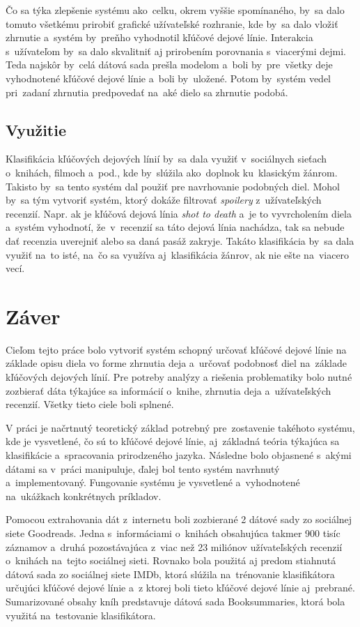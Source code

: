 Čo sa týka zlepšenie systému ako~celku, okrem vyššie spomínaného, by~sa dalo tomuto všetkému prirobiť grafické užívateľské rozhranie, kde by~sa dalo vložiť zhrnutie a~systém by~preňho vyhodnotil kľúčové dejové línie. Interakcia s~užívateľom by~sa dalo skvalitniť aj prirobením porovnania s~viacerými dejmi. Teda najskôr by~celá dátová sada prešla modelom a~boli by~pre~všetky deje vyhodnotené kľúčové dejové línie a~boli by~uložené. Potom by~systém vedel pri~zadaní zhrnutia predpovedať na~aké dielo sa zhrnutie podobá. 

\pagebreak
\section{Využitie}

Klasifikácia kľúčových dejových línií by~sa dala využiť v~sociálnych sieťach o~knihách, filmoch a~pod., kde by~slúžila ako~doplnok ku~klasickým žánrom. Takisto by~sa tento systém dal použiť pre navrhovanie podobných diel. Mohol by~sa tým vytvoriť systém, ktorý dokáže filtrovať \textit{spoilery} z~užívateľských recenzií. Napr. ak je kľúčová dejová línia \textit{shot to death} a~je to vyvrcholením diela a~systém vyhodnotí, že~v~recenzií sa táto dejová línia nachádza, tak sa nebude dať recenzia uverejniť alebo sa daná pasáž zakryje. Takáto klasifikácia by~sa dala využiť na~to isté, na~čo sa využíva aj~klasifikácia žánrov, ak nie ešte na~viacero vecí.


\chapter{Záver}
\label{zaver}

Cieľom tejto práce bolo vytvoriť systém schopný určovať kľúčové dejové línie na základe opisu diela vo forme zhrnutia deja a~určovať podobnosť diel na~základe kľúčových dejových línií. Pre potreby analýzy a riešenia problematiky bolo nutné zozbierať dáta týkajúce sa informácií o~knihe, zhrnutia deja a~užívateľských recenzií. Všetky tieto ciele boli splnené. 

V práci je načrtnutý teoretický základ potrebný pre~zostavenie takéhoto systému, kde je vysvetlené, čo sú to kľúčové dejové línie, aj~základná teória týkajúca sa klasifikácie a~spracovania prirodzeného jazyka. Následne bolo objasnené s~akými dátami sa v~práci manipuluje, ďalej bol tento systém navrhnutý a~implementovaný. Fungovanie systému je vysvetlené a~vyhodnotené na~ukážkach konkrétnych príkladov.

Pomocou extrahovania dát z~internetu boli zozbierané 2 dátové sady zo sociálnej siete Goodreads. Jedna s~informáciami o~knihách obsahujúca takmer 900 tisíc záznamov a~druhá pozostávajúca z~viac než 23 miliónov užívateľských recenzií o~knihách na~tejto sociálnej sieti. Rovnako bola použitá aj predom stiahnutá dátová sada zo sociálnej siete IMDb, ktorá slúžila na~trénovanie klasifikátora určujúci kľúčové dejové línie a~z ktorej boli tieto kľúčové dejové línie aj~prebrané. Sumarizované obsahy kníh predstavuje dátová sada Booksummaries, ktorá bola využitá na~testovanie klasifikátora.

